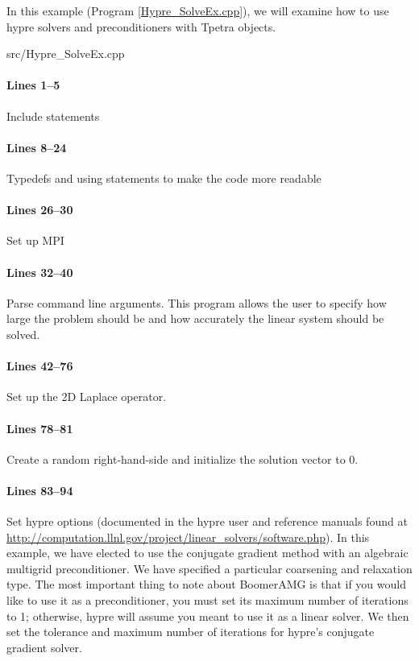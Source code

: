 In this example (Program \ref{Hypre_SolveEx.cpp}), we will examine how to use
hypre solvers and preconditioners with Tpetra objects.

\begin{lstinputlisting}[caption=Hypre\_SolveEx.cpp,label=Hypre_SolveEx.cpp]{src/Hypre_SolveEx.cpp}
\end{lstinputlisting}

\paragraph{Lines 1--5}
Include statements

\paragraph{Lines 8--24}
Typedefs and using statements to make the code more readable

\paragraph{Lines 26--30}
Set up MPI

\paragraph{Lines 32--40}
Parse command line arguments.  This program allows the user to specify how large
the problem should be and how accurately the linear system should be solved.

\paragraph{Lines 42--76}
Set up the 2D Laplace operator.

\paragraph{Lines 78--81}
Create a random right-hand-side and initialize the solution vector to 0.

\paragraph{Lines 83--94}
Set hypre options (documented in the hypre user and reference manuals found at
\url{http://computation.llnl.gov/project/linear_solvers/software.php}). In this
example, we have elected to use the conjugate gradient method with an algebraic
multigrid preconditioner.  We have specified a particular coarsening and
relaxation type.  The most important thing to note about BoomerAMG is that if
you would like to use it as a preconditioner, you must set its maximum number of
iterations to 1; otherwise, hypre will assume you meant to use it as a linear
solver.  We then set the tolerance and maximum number of iterations for hypre's
conjugate gradient solver.

